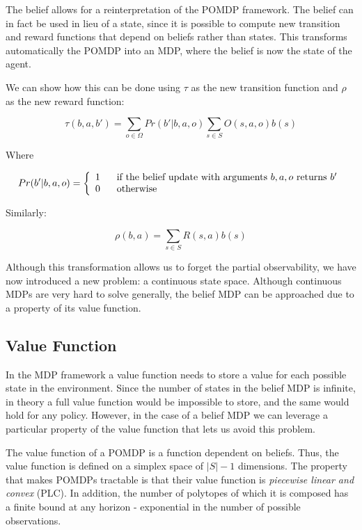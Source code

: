 The belief allows for a reinterpretation of the POMDP framework. The belief can in fact be used in
lieu of a state, since it is possible to compute new transition and reward functions that depend on
beliefs rather than states. This transforms automatically the POMDP into an MDP, where the
belief is now the state of the agent.

We can show how this can be done using $\tau$ as the new transition function and $\rho$ as the new
reward function:

\[ \tau(b,a,b') = \sum_{o\in \Omega} Pr(b' | b, a, o) \sum_{s\in S} O(s,a,o) b(s) \]

Where

\[Pr(b' | b, a, o) = \left\{
  \begin{array}{lr}
    1 \hspace{.6cm}\text{if the belief update with arguments $b,a,o$ returns $b'$}\\
    0 \hspace{.6cm}\text{otherwise}
  \end{array}
\right.
\]

Similarly:

\[ \rho(b,a) = \sum_{s\in S} R(s,a) b(s) \]

Although this transformation allows us to forget the partial observability, we have now introduced a
new problem: a continuous state space. Although continuous MDPs are very hard to solve generally,
the belief MDP can be approached due to a property of its value function.

\subsection{Value Function}

In the MDP framework a value function needs to store a value for each possible state in the
environment. Since the number of states in the belief MDP is infinite, in theory a full value
function would be impossible to store, and the same would hold for any policy. However, in the case
of a belief MDP we can leverage a particular property of the value function that lets us avoid this
problem.

The value function of a POMDP is a function dependent on beliefs. Thus, the value function is
defined on a simplex space of $|S|-1$ dimensions. The property that makes POMDPs tractable is
that their value function is \textit{piecewise linear and convex} (PLC). In addition, the number of
polytopes of which it is composed has a finite bound at any horizon - exponential in the number of
possible observations.

